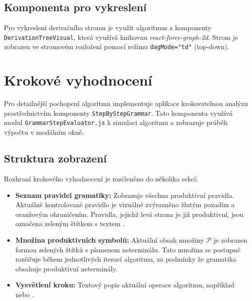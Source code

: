 \subsection{Komponenta pro vykreslení}
\label{sec:GrammarsTreeComponent}

Pro vykreslení derivačního stromu je využit algoritmus z komponenty \texttt{DerivationTreeVisual}, která využívá knihovnu \emph{react-force-graph-2d}. Strom je zobrazen ve stromovém rozložení pomocí režimu \texttt{dagMode="td"} (top-down).

\section{Krokové vyhodnocení}
\label{sec:GrammarsStepByStep}

Pro detailnější pochopení algoritmu implementuje aplikace krokovatelnou analýzu prostřednictvím komponenty \texttt{StepByStepGrammar}. Tato komponenta využívá modul \texttt{GrammarStepEvaluator.js} k simulaci algoritmu a zobrazuje průběh výpočtu v modálním okně.

\subsection{Struktura zobrazení}
\label{sec:GrammarsStepByStepStructure}

Rozhraní krokového vyhodnocení je rozčleněno do několika sekcí:

\begin{itemize}
    \item \textbf{Seznam pravidel gramatiky:} Zobrazuje všechna produktivní pravidla. Aktuálně kontrolované pravidlo je vizuálně zvýrazněno žlutým pozadím a oranžovým ohraničením. Pravidla, jejichž levá strana je již produktivní, jsou označena zeleným štítkem s textem .
    
    \item \textbf{Množina produktivních symbolů:} Aktuální obsah množiny \( \mathcal{P} \) je zobrazen formou zelených štítků s písmenem neterminálu. Tato množina se postupně rozšiřuje během jednotlivých iterací algoritmu, za podmínky že gramatika obsahuje produktivní neterminály.
    
    \item \textbf{Vysvětlení kroku:} Textový popis aktuální operace algoritmu, například  nebo .
\end{itemize}

